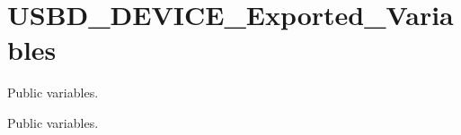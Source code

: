 \hypertarget{group__USBD__DEVICE__Exported__Variables}{}\section{U\+S\+B\+D\+\_\+\+D\+E\+V\+I\+C\+E\+\_\+\+Exported\+\_\+\+Variables}
\label{group__USBD__DEVICE__Exported__Variables}


Public variables.  


Public variables. 

